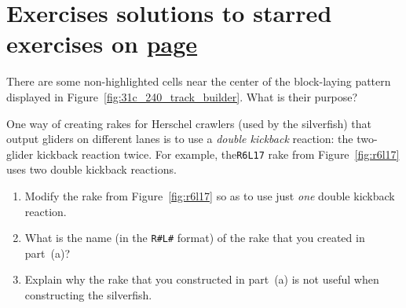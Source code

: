 \section*{Exercises \hfill \normalfont\textsf{\small solutions to starred exercises on \hyperlink{solutions_self_support_spaceships}{page \pageref{solutions_self_support_spaceships}}}}
\label{sec:solutions_self_support_spaceships}
\vspace*{-0.4cm}\hrulefill\vspace*{-0.3cm}\footnotesize\begin{multicols}{2}\vspace*{-0.4cm}\raggedcolumns{}
\setlength{\parskip}{0pt}


\begin{problem}\label{exer:self_support_spaceships_track_layer_rephaser}
	There are some non-highlighted cells near the center of the block-laying pattern displayed in Figure~\ref{fig:31c_240_track_builder}. What is their purpose?
\end{problem}


\mfilbreak


\begin{problemstar}\label{exer:self_support_spaceships_r4l1}
	One way of creating rakes for Herschel crawlers (used by the silverfish) that output gliders on different lanes is to use a \emph{double kickback} reaction: the two-glider kickback reaction twice. For example, the\texttt{R6L17} rake from Figure~\ref{fig:r6l17} uses two double kickback reactions.
	
	\begin{enumerate}[label=\bf\color{ocre}(\alph*)]
		\item Modify the rake from Figure~\ref{fig:r6l17} so as to use just \emph{one} double kickback reaction.
		
		\item What is the name (in the \texttt{R\#L\#} format) of the rake that you created in part~(a)?
		
		\item Explain why the rake that you constructed in part~(a) is not useful when constructing the silverfish.
	\end{enumerate}
\end{problemstar}



\end{multicols}
